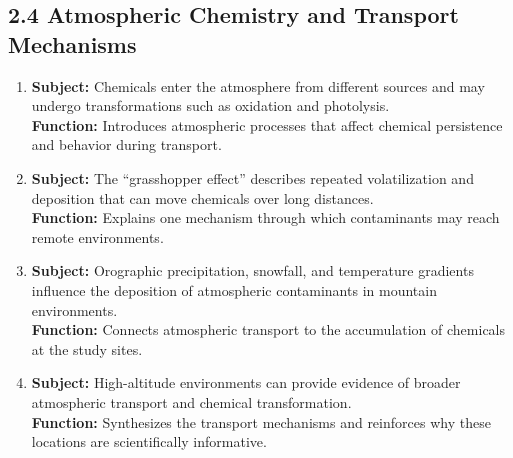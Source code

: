 \documentclass[11pt]{article}
\begin{document}
\begin{doublespace}
    \subsection{2.4 Atmospheric Chemistry and Transport Mechanisms}
        \begin{enumerate}[label=\textbf{Paragraph \arabic*:}, start=11, leftmargin=*]
            \item \textbf{Subject:} Chemicals enter the atmosphere from different sources and may undergo transformations such as oxidation and photolysis.\\
            \textbf{Function:} Introduces atmospheric processes that affect chemical persistence and behavior during transport.
            \item \textbf{Subject:} The ``grasshopper effect'' describes repeated volatilization and deposition that can move chemicals over long distances.\\
            \textbf{Function:} Explains one mechanism through which contaminants may reach remote environments.
            \item \textbf{Subject:} Orographic precipitation, snowfall, and temperature gradients influence the deposition of atmospheric contaminants in mountain environments.\\
            \textbf{Function:} Connects atmospheric transport to the accumulation of chemicals at the study sites.
            \item \textbf{Subject:} High-altitude environments can provide evidence of broader atmospheric transport and chemical transformation.\\
            \textbf{Function:} Synthesizes the transport mechanisms and reinforces why these locations are scientifically informative.
        \end{enumerate}


\end{doublespace}
\end{document}
